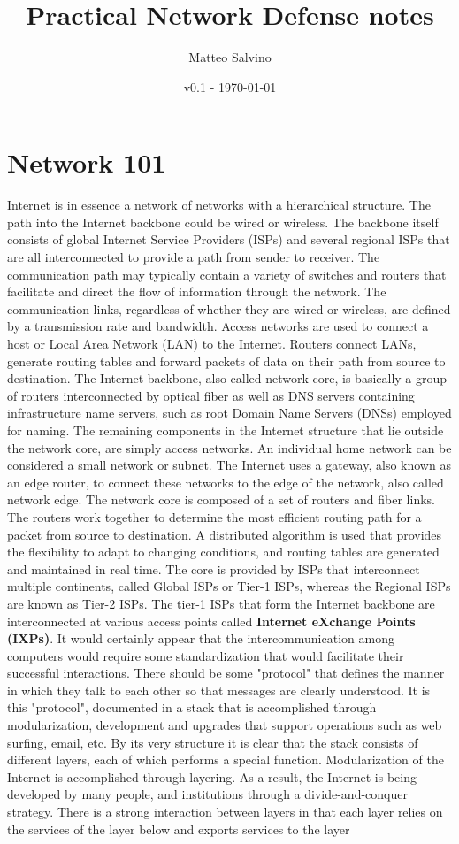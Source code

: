 \documentclass[11pt]{article}
\title{Practical Network Defense notes}
\author{Matteo Salvino}
\date{v0.1 - \today}
\begin{document}
\maketitle
\pagebreak
\tableofcontents
\pagebreak
\section{Network 101}
Internet is in essence a network of networks with a hierarchical structure. The path into the Internet backbone could be wired or wireless. The backbone itself consists of global Internet Service Providers (ISPs) and several regional ISPs that are all interconnected to provide a path from sender to receiver. The communication path may typically contain a variety of switches and routers that facilitate and direct the flow of information through the network. The communication links, regardless of whether they are wired or wireless, are defined by a transmission rate and bandwidth. Access networks are used to connect a host or Local Area Network (LAN) to the Internet. Routers connect  LANs, generate routing tables and forward  packets of data on their path from source to destination. The Internet backbone, also called network core, is basically a group of routers interconnected by optical fiber as well as DNS servers containing infrastructure name servers, such as root Domain Name Servers (DNSs) employed for naming. The remaining components in the Internet structure that lie outside the network core, are simply access networks. An individual home network can be considered a small network or subnet. The Internet uses a gateway, also known as an edge router, to connect these networks to the edge of the network, also called network edge. The network core is composed of a set of routers and fiber links. The routers work together to determine the most efficient routing path for a packet from source to destination. A distributed algorithm is used that provides the flexibility to adapt to changing conditions, and routing tables are generated and maintained in real time. The core is provided by ISPs that interconnect multiple continents, called Global ISPs or Tier-1 ISPs, whereas the Regional ISPs are known as Tier-2 ISPs. The tier-1 ISPs that form the Internet backbone are interconnected at various access points called \textbf{Internet eXchange Points (IXPs)}. It would certainly appear that the intercommunication among computers would require some standardization that would facilitate their successful interactions. There should be some "protocol" that defines the manner in which they talk to each other so that messages are clearly understood. It is this "protocol", documented in a stack that is accomplished through modularization, development and upgrades that support operations such as web surfing, email, etc. By its very structure it is clear that the stack consists of different layers, each  of which performs a special function. Modularization of the Internet is accomplished through layering. As a result, the Internet is being developed by many people, and institutions through a divide-and-conquer strategy. There is a strong interaction between layers in that each layer relies on the services of the layer below and exports services to the layer 
\end{document}
